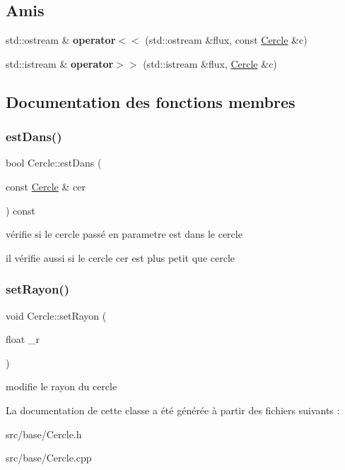 \subsection*{Amis}
\begin{DoxyCompactItemize}
\item 
\mbox{\label{class_cercle_af7fb3753d7cc4b5351ff4d5e2953c77b}} 
std\+::ostream \& {\bfseries operator$<$$<$} (std\+::ostream \&flux, const \mbox{\hyperlink{class_cercle}{Cercle}} \&c)
\item 
\mbox{\label{class_cercle_a0cdd6e3f2bf6edde510863a0c5993627}} 
std\+::istream \& {\bfseries operator$>$$>$} (std\+::istream \&flux, \mbox{\hyperlink{class_cercle}{Cercle}} \&c)
\end{DoxyCompactItemize}


\subsection{Documentation des fonctions membres}
\mbox{\label{class_cercle_a256c98a53c132fddfb4fa23247ba4dde}} 
\subsubsection{\texorpdfstring{est\+Dans()}{estDans()}}
{\footnotesize\ttfamily bool Cercle\+::est\+Dans (\begin{DoxyParamCaption}\item[{const \mbox{\hyperlink{class_cercle}{Cercle}} \&}]{cer }\end{DoxyParamCaption}) const}



vérifie si le cercle passé en parametre est dans le cercle 

il vérifie aussi si le cercle cer est plus petit que cercle \mbox{\label{class_cercle_aa8a8df2a669f39962bbaac2da474e401}} 
\subsubsection{\texorpdfstring{set\+Rayon()}{setRayon()}}
{\footnotesize\ttfamily void Cercle\+::set\+Rayon (\begin{DoxyParamCaption}\item[{float}]{\+\_\+r }\end{DoxyParamCaption})}

modifie le rayon du cercle 

La documentation de cette classe a été générée à partir des fichiers suivants \+:\begin{DoxyCompactItemize}
\item 
src/base/Cercle.\+h\item 
src/base/Cercle.\+cpp\end{DoxyCompactItemize}
